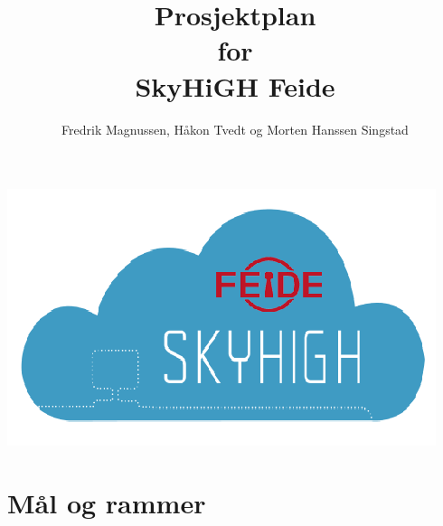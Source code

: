 \documentclass[12pt,a4paper]{article}
\begin{document}
\title{Prosjektplan \\ for \\ SkyHiGH Feide}
\author{Fredrik Magnussen, Håkon Tvedt og Morten Hanssen Singstad}
\maketitle
\begin{center}
	\includegraphics[scale=1]{logo.png}
\end{center}

\newpage
\tableofcontents

\newpage
\section{Mål og rammer}
\end{document}
